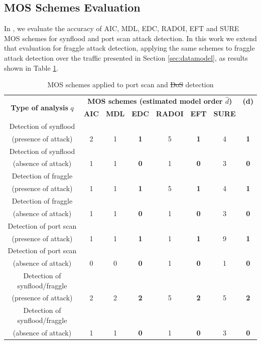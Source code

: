 \documentclass[review]{elsarticle}
\providecommand{\DIFaddtex}[1]{{\protect\color{blue}\uwave{#1}}} %
\providecommand{\DIFdeltex}[1]{{\protect\color{red}\sout{#1}}}                      %
\providecommand{\DIFaddFL}[1]{\DIFadd{#1}} %
\providecommand{\DIFdelFL}[1]{\DIFdel{#1}} %
\providecommand{\DIFaddbeginFL}{} %
\providecommand{\DIFaddendFL}{} %
\providecommand{\DIFdelbeginFL}{} %
\providecommand{\DIFdelendFL}{} %
\providecommand{\DIFadd}[1]{\texorpdfstring{\DIFaddtex{#1}}{#1}} %
\providecommand{\DIFdel}[1]{\texorpdfstring{\DIFdeltex{#1}}{}} %
\begin{document}
\subsection{MOS Schemes Evaluation}
\label{sec:MOSSchemesEvaluation}

In \cite{tenorio2013greatest}, we evaluate the accuracy of AIC, MDL, EDC, RADOI, EFT and SURE MOS schemes \cite{da2009comparison,tenorio2013greatest} for synflood and port scan attack detection. In this work we extend that evaluation for fraggle attack detection, applying the same schemes to fraggle attack detection over the traffic presented in Section \ref{sec:datamodel}, as results shown in Table \ref{tab:tab4}.

\begin{table}[h!]
  \centering
  \scriptsize
  \caption{MOS schemes applied to port scan and \DIFdelbeginFL \DIFdelFL{DoS }\DIFdelendFL \DIFaddbeginFL \DIFaddFL{flood }\DIFaddendFL detection}
  \label{tab:tab4}
  \begin{tabular}{ c c c c c c c c }
	\toprule
	\multirow{2}{*}{\textbf{Type of analysis} $q$} &\multicolumn{6}{c}{\textbf{MOS schemes (estimated model order $\hat{d}$)}} &{\textbf{(d)}}\\ 
			\hhline{~------~}
		&\textbf{AIC} &\textbf{MDL} &\textbf{EDC} &\textbf{RADOI} &\textbf{EFT} &\textbf{SURE}\\
	\midrule
	Detection of synflood \\(presence of attack) &2 &1 &\textbf{1} &5 &\textbf{1} &4 &\textbf{1} \\
	Detection of synflood \\(absence of attack) &1 &1 &\textbf{0} &1 &\textbf{0} &3 &\textbf{0} \\
	\midrule
	Detection of fraggle \\(presence of attack) &1 &1 &\textbf{1} &5 &\textbf{1} &4 &\textbf{1} \\
	Detection of fraggle \\(absence of attack) &1 &1 &\textbf{0} &1 &\textbf{0} &3 &\textbf{0} \\
	\midrule
	Detection of port scan \\(presence of attack) &1 &1 &\textbf{1} &1 &\textbf{1} &9 &\textbf{1} \\
	Detection of port scan \\(absence of attack) &0 &0 &\textbf{0} &1 &\textbf{0} &1 &\textbf{0} \\
	\midrule
	Detection of synflood/fraggle \\(presence of attack) &2 &2 &\textbf{2} &5 &\textbf{2} &5 &\textbf{2} \\
	Detection of synflood/fraggle \\(absence of attack) &1 &1 &\textbf{0} &1 &\textbf{0} &3 &\textbf{0} \\
    \bottomrule
  \end{tabular}
\end{table}
\end{document}
